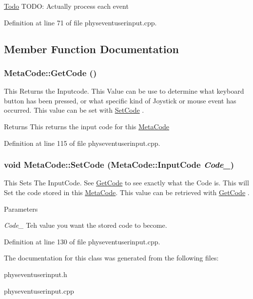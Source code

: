 \begin{Desc}
\item[\hyperlink{todo__todo000002}{Todo}]TODO: Actually process each event \end{Desc}


Definition at line 71 of file physeventuserinput.cpp.

\subsection{Member Function Documentation}
\hypertarget{classMetaCode_a862b35146ab4aa24f78bf951cfa21aa8}{
\subsubsection[{GetCode}]{ MetaCode::GetCode ()}}
\label{d7/d72/classMetaCode_a862b35146ab4aa24f78bf951cfa21aa8}


This Returns the Inputcode. This Value can be use to determine what keyboard button has been pressed, or what specific kind of Joystick or mouse event has occurred. This value can be set with \hyperlink{classMetaCode_acfc73f0b06c9a727f59681779caed03d}{SetCode} . \begin{DoxyReturn}{Returns}
This returns the input code for this \hyperlink{classMetaCode}{MetaCode} 
\end{DoxyReturn}


Definition at line 115 of file physeventuserinput.cpp.\hypertarget{classMetaCode_acfc73f0b06c9a727f59681779caed03d}{
\subsubsection[{SetCode}]{\setlength{\rightskip}{0pt plus 5cm}void MetaCode::SetCode ({\bf MetaCode::InputCode} {\em Code\_\-})}}
\label{d7/d72/classMetaCode_acfc73f0b06c9a727f59681779caed03d}


This Sets The InputCode. See \hyperlink{classMetaCode_a862b35146ab4aa24f78bf951cfa21aa8}{GetCode} to see exactly what the Code is. This will Set the code stored in this \hyperlink{classMetaCode}{MetaCode}. This value can be retrieved with \hyperlink{classMetaCode_a862b35146ab4aa24f78bf951cfa21aa8}{GetCode} . 
\begin{DoxyParams}{Parameters}
\item[{\em Code\_\-}]Teh value you want the stored code to become. \end{DoxyParams}


Definition at line 130 of file physeventuserinput.cpp.

The documentation for this class was generated from the following files:\begin{DoxyCompactItemize}
\item 
physeventuserinput.h\item 
physeventuserinput.cpp\end{DoxyCompactItemize}
